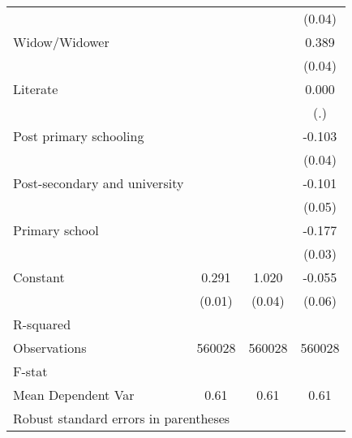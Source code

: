 {\begin{tabular}{l*{3}{c}}
                    &                     &                     &      (0.04)         \\
Widow/Widower       &                     &                     &       0.389\sym{***}\\
                    &                     &                     &      (0.04)         \\
Literate            &                     &                     &       0.000         \\
                    &                     &                     &         (.)         \\
Post primary schooling&                     &                     &      -0.103\sym{**} \\
                    &                     &                     &      (0.04)         \\
Post-secondary and university&                     &                     &      -0.101         \\
                    &                     &                     &      (0.05)         \\
Primary school      &                     &                     &      -0.177\sym{***}\\
                    &                     &                     &      (0.03)         \\
Constant            &       0.291\sym{***}&       1.020\sym{***}&      -0.055         \\
                    &      (0.01)         &      (0.04)         &      (0.06)         \\
\hline
R-squared           &                     &                     &                     \\
Observations        &      560028         &      560028         &      560028         \\
F-stat              &                     &                     &                     \\
Mean Dependent Var  &        0.61         &        0.61         &        0.61         \\
\hline\hline
\multicolumn{4}{l}{\footnotesize Robust standard errors in parentheses}\\
\end{tabular}
}

